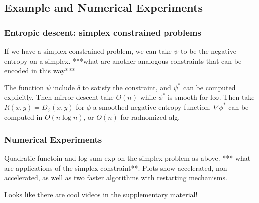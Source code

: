 \subsection{Example and Numerical Experiments}
\subsubsection{Entropic descent: simplex constrained problems}
If we have a simplex constrained problem, we can take $\psi$ to be the negative entropy on a simplex. ***what are another analogous constraints that can be encoded in this way***

The function $\psi$ include $\delta$ to satisfy the constraint, and $\psi^*$ can be computed explicitly. Then mirror descent take $O(n)$ while $\phi^*$ is smooth for l$\infty$. Then take $R(x,y) = D_\phi(x,y)$ for $\phi$ a smoothed negative entropy function. $\nabla \phi^*$ can be computed in $O(n\log n)$, or $O(n)$ for radnomized alg. 

\subsubsection{Numerical Experiments}
Quadratic functoin and log-sum-exp on the simplex problem as above. *** what are applications of the simplex constraint**. Plots show accelerated, non-accelerated, as well as two faster algorithms with restarting mechanisms. 

Looks like there are cool videos in the supplementary material!